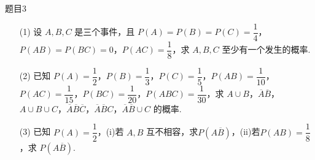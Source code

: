 \begin{question}{题目3}
    \begin{itemize}
        \item [(1)] 设 $A,B,C$ 是三个事件，且 $P(A) = P(B) = P(C) = \dfrac{1}{4}$，$P(AB) = P(BC) = 0$，$P(AC) = \dfrac{1}{8}$，求 $A,B,C$ 至少有一个发生的概率.

        \item [(2)] 已知 $P(A) = \dfrac{1}{2}$，$P(B) = \dfrac{1}{3}$，$P(C) = \dfrac{1}{5}$，$P(AB) = \dfrac{1}{10}$，$P(AC) = \dfrac{1}{15}$，$P(BC) = \dfrac{1}{20}$，$P(ABC) = \dfrac{1}{30}$，求 $A \cup B$，$\overline{A}\overline{B}$，$A \cup B \cup C$，$\overline{A}\overline{B}\overline{C}$，$\overline{A}\overline{B}C$，$\overline{A} \overline{B}\cup C$ 的概率.

        \item [(3)] 已知 $P(A) = \dfrac{1}{2}$，(i)若 $A,B$ 互不相容，求$P(A\overline{B})$，(ii)若$P(AB) = \dfrac{1}{8}$，求 $P(A\overline{B})$.
    \end{itemize}
\end{question}
